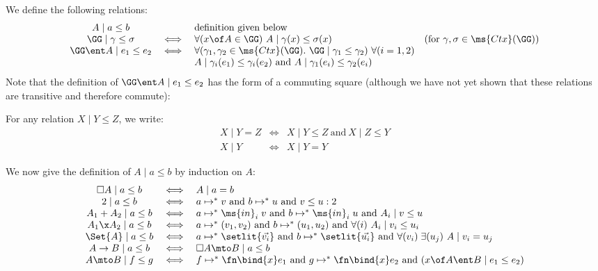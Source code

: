 \documentclass{article}
\newcommand{\step}{\mapsto}
\newcommand{\lr}[2]{#1\mathrel{|}#2}
\newcommand{\steps}{\step^*}
\renewcommand{\land}{~\text{and}~}
\newcommand{\disc}[1]{\square{#1}}
\begin{document}
We define the following relations:
\[\begin{array}{ccll}
    \lr{A}{a \le b}  && \text{definition given below}\\
    \lr{\GG}{\gamma \le \sigma}
    &\iff& \forall(x\of A \in \GG)\ \lr{A}{\gamma(x) \le \sigma(x)}
    & (\text{for}~\gamma,\sigma \in \ms{Ctx}(\GG))\\
    \lr{\GG\ent A}{e_1 \le e_2}
    &\iff& \forall(\gamma_1, \gamma_2 \in \ms{Ctx}(\GG).\ \lr{\GG}{\gamma_1 \le \gamma_2})
    \ \forall(i = 1,2)\\
    &&
    \lr{A}{\gamma_i(e_1) \le \gamma_i(e_2)} \land \lr{A}{\gamma_1(e_i) \le \gamma_2(e_i)}
\end{array}\]
Note that the definition of $\lr{\GG\ent A}{e_1 \le e_2}$ has the form of a
commuting square (although we have not yet shown that these relations are
transitive and therefore commute): 

For any relation $\lr{X}{Y \le Z}$, we write:
\[\begin{array}{ccl}
  \lr{X}{Y = Z} &\iff& \lr{X}{Y \le Z} \land \lr{X}{Z \le Y}\\
  \lr{X}{Y}     &\iff& \lr{X}{Y = Y}
\end{array}\]

We now give the definition of $\lr{A}{a \le b}$ by induction on $A$:
\[\begin{array}{ccl}
  \lr{\disc{A}}{a \le b} &\iff& \lr{A}{a = b}\\
  \lr{2}{a \le b} &\iff&
  a \steps v \land b \steps u \land v \le u : 2\\
  \lr{A_1 + A_2}{a \le b} &\iff&
  a \steps \ms{in}_i\;v \land b \steps \ms{in}_i\;u \land \lr{A_i}{v \le u}\\
  \lr{A_1 \x A_2}{a \le b} &\iff&
  a \steps (v_1, v_2) \land b \steps (u_1, u_2) \land \forall(i)\ \lr{A_i}{v_i \le u_i}\\
  \lr{\Set{A}}{a \le b} &\iff&
  a \steps \setlit{\vec{v_i}} \land b \steps \setlit{\vec{u_i}}
  \land \forall(v_i)\;\exists(u_j)\ \lr{A}{v_i = u_j}\\
  \lr{A \to B}{a \le b} &\iff& \lr{\disc{A} \mto B}{a \le b}\\
  \lr{A \mto B}{f \le g} &\iff&
  f \steps \fn\bind{x} e_1 \land g \steps \fn\bind{x} e_2
  \land (\lr{x\of A \ent B}{e_1 \le e_2})
\end{array}\]
\end{document}
